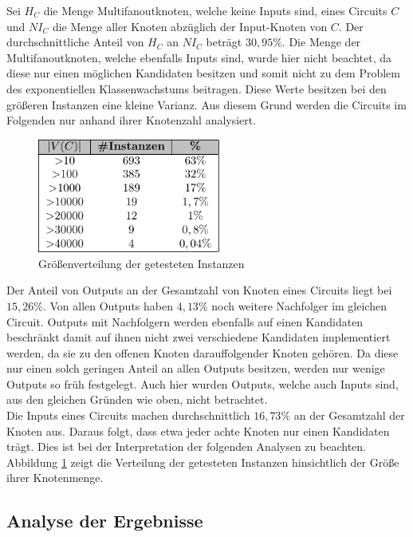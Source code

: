 \documentclass[11pt, a4paper, german]{article}
\begin{document}
Sei $H_C$ die Menge Multifanoutknoten, welche keine Inputs sind, eines Circuits $C$ und $NI_C$ die Menge aller Knoten abz\"uglich der Input-Knoten von $C$. Der durchschnittliche Anteil von $H_C$ an $NI_C$ betr\"agt $30,95\%$. Die Menge der Multifanoutknoten, welche ebenfalls Inputs sind, wurde hier nicht beachtet, da diese nur einen m\"oglichen Kandidaten besitzen und somit nicht zu dem Problem des exponentiellen Klassenwachstums beitragen. Diese Werte besitzen bei den gr\"o{\ss}eren Instanzen eine kleine Varianz. Aus diesem Grund werden die Circuits im Folgenden nur anhand ihrer Knotenzahl analysiert.\\
   \begin{figure}
		\includegraphics[width = 6cm]{pictures/compiled/instance_sizes_distribution_table}
		\caption{Gr\"o{\ss}enverteilung der getesteten Instanzen}
		\label{bild:sizes_table}
	\end{figure}
 Der Anteil von Outputs an der Gesamtzahl von Knoten eines Circuits liegt bei $15,26\%$. Von allen Outputs haben $4,13\%$ noch weitere Nachfolger im gleichen Circuit. Outputs mit Nachfolgern werden ebenfalls auf einen Kandidaten beschr\"ankt damit auf ihnen nicht zwei verschiedene Kandidaten implementiert werden, da sie zu den offenen Knoten darauffolgender Knoten gehören. Da diese nur einen solch geringen Anteil an allen Outputs besitzen, werden nur wenige Outputs so fr\"uh festgelegt. Auch hier wurden Outputs, welche auch Inputs sind, aus den gleichen Gr\"unden wie oben, nicht betrachtet.\\
 Die Inputs eines Circuits machen durchschnittlich $16,73\%$ an der Gesamtzahl der Knoten aus. Daraus folgt, dass etwa jeder achte Knoten nur einen Kandidaten tr\"agt. Dies ist bei der Interpretation der folgenden Analysen zu beachten.\\
 Abbildung \ref{bild:sizes_table} zeigt die Verteilung der getesteten Instanzen hinsichtlich der Größe  ihrer Knotenmenge.
 
 
 \subsection{Analyse der Ergebnisse}
 \label{subsec:analyse_der_ergebnisse}
\end{document}
